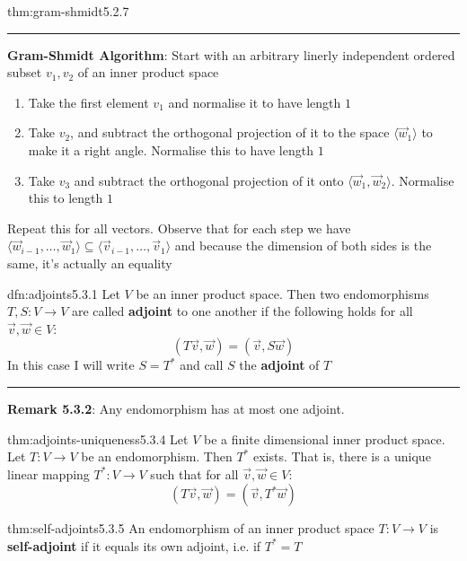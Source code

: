 \documentclass[landscape, 8pt]{extarticle}
\begin{document}
\begin{multicols}{3}
\begin{thm}{thm:gram-shmidt}{5.2.7}
    \noindent\rule{\textwidth}{0.2pt}
    \textbf{Gram-Shmidt Algorithm}: Start with an arbitrary linerly independent ordered subset $v_{1}, v_{2}$ of an inner product space
    \begin{enumerate}
        \setlength\itemsep{0em}
        \item Take the first element $v_{1}$ and normalise it to have length $1$
        \item Take $v_{2}$, and subtract the orthogonal projection of it to the space $\langle \vec{w}_{1} \rangle$ to make it a right angle. Normalise this to have length $1$
        \item Take $v_{3}$ and subtract the orthogonal projection of it onto $\langle \vec{w}_{1}, \vec{w}_{2} \rangle$. Normalise this to length $1$
    \end{enumerate}
    Repeat this for all vectors. Observe that for each step we have $\langle \vec{w}_{i-1},\dots,\vec{w}_{1} \rangle \subseteq \langle \vec{v}_{i-1},\dots, \vec{v}_{1} \rangle$ and because the dimension of both sides is the same, it's actually an equality
\end{thm}

\begin{dfn}[Adjoints]{dfn:adjoints}{5.3.1}
    Let $V$ be an inner product space. Then two endomorphisms $T, S : V\to V$ are called \textbf{adjoint} to one another if the following holds for all $\vec{v}, \vec{w}\in V$:
    \[(T \vec{v}, \vec{w}) = (\vec{v}, S\vec{w})\]
    In this case I will write $S = T^{*}$ and call $S$ the \textbf{adjoint} of $T$

    \noindent\rule{\textwidth}{0.2pt}
    \textbf{Remark 5.3.2}: Any endomorphism has at most one adjoint.
\end{dfn}

\begin{thm}[]{thm:adjoints-uniqueness}{5.3.4}
    Let $V$ be a finite dimensional inner product space. Let $T : V \to V$ be an endomorphism. Then $T^{*}$ exists. That is, there is a unique linear mapping $T^{*} : V \to V$ such that for all $\vec{v}, \vec{w}\in V$:
    \[(T \vec{v}, \vec{w}) = (\vec{v}, T^{*}\vec{w})\]
\end{thm}

\begin{dfn}{thm:self-adjoints}{5.3.5}
    \vspace{-5pt}
    An endomorphism of an inner product space $T : V \to V$ is \textbf{self-adjoint} if it equals its own adjoint, i.e. if $T^{*} = T$
    

\end{dfn}
\end{multicols}
\end{document}
